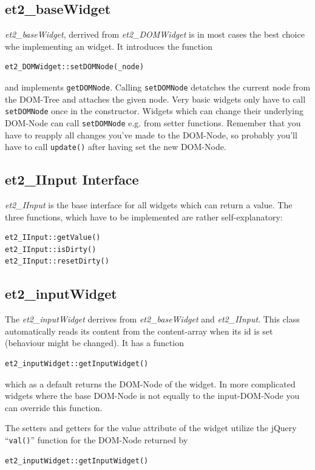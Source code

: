 \documentclass[10pt,a4paper]{report}
\begin{document}
\subsection*{et2\_baseWidget}
\textit{et2\_baseWidget}, derrived from \textit{et2\_DOMWidget} is in most cases the best choice whe implementing an widget. It introduces the function
\begin{verbatim}
et2_DOMWidget::setDOMNode(_node)
\end{verbatim}
and implements \texttt{getDOMNode}. Calling \texttt{setDOMNode} detatches the current node from the DOM-Tree and attaches the given node. Very basic widgets only have to call \texttt{setDOMNode} once in the constructor. Widgets which can change their underlying DOM-Node can call \texttt{setDOMNode} e.g. from setter functions. Remember that you have to reapply all changes you've made to the DOM-Node, so probably you'll have to call \texttt{update()} after having set the new DOM-Node.

\subsection*{et2\_IInput Interface}
\textit{et2\_IInput} is the base interface for all widgets which can return a value. The three functions, which have to be implemented are rather self-explanatory:
\begin{verbatim}
et2_IInput::getValue()
et2_IInput::isDirty()
et2_IInput::resetDirty()
\end{verbatim}

\subsection*{et2\_inputWidget}
The \textit{et2\_inputWidget} derrives from \textit{et2\_baseWidget} and \textit{et2\_IInput}. This class automatically reads its content from the content-array when its id is set (behaviour might be changed). It has a function
\begin{verbatim}
et2_inputWidget::getInputWidget()
\end{verbatim}
which as a default returns the DOM-Node of the widget. In more complicated widgets where the base DOM-Node is not equally to the input-DOM-Node you can override this function.

The setters and getters for the value attribute of the widget utilize the jQuery ``\texttt{val()}'' function for the DOM-Node returned by
\begin{verbatim}
et2_inputWidget::getInputWidget()
\end{verbatim}
\end{document}
